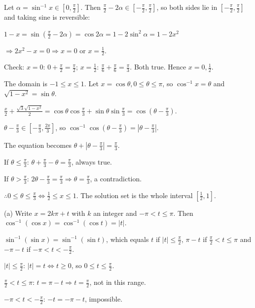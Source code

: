   Let $\alpha = \sin^{-1}x\in\left[0, \frac{\pi}{2}\right]$. Then $\frac{\pi}{2} - 2\alpha\in\left[-\frac{\pi}{2},
  \frac{\pi}{2}\right]$, so both sides lie in $\left[-\frac{\pi}{2}, \frac{\pi}{2}\right]$ and taking sine is
  reversible:

  $1 - x = \sin\left(\frac{\pi}{2} - 2\alpha\right) = \cos2\alpha = 1 - 2\sin^2\alpha = 1 - 2x^2$

  $\Rightarrow 2x^2 - x = 0\Rightarrow x = 0$ or $x = \frac{1}{2}$.

  Check: $x = 0$: $0 + \frac{\pi}{2} = \frac{\pi}{2}$; $x = \frac{1}{2}$: $\frac{\pi}{6} + \frac{\pi}{6} =
  \frac{\pi}{3}$. Both true. Hence $x = 0, \frac{1}{2}$.
\item The domain is $-1\le x\le 1$. Let $x = \cos\theta, 0\le\theta\le\pi$, so $\cos^{-1}x = \theta$ and $\sqrt{1 -
  x^2} = \sin\theta$.

  $\frac{x}{2} + \frac{\sqrt{3}\sqrt{1 - x^2}}{2} = \cos\theta\cos\frac{\pi}{3} + \sin\theta\sin\frac{\pi}{3} =
  \cos\left(\theta - \frac{\pi}{3}\right)$.

  $\theta - \frac{\pi}{3}\in\left[-\frac{\pi}{3}, \frac{2\pi}{3}\right]$, so $\cos^{-1}\cos\left(\theta -
  \frac{\pi}{3}\right) = \left|\theta - \frac{\pi}{3}\right|$.

  The equation becomes $\theta + \left|\theta - \frac{\pi}{3}\right| = \frac{\pi}{3}$.

  If $\theta\le\frac{\pi}{3}$: $\theta + \frac{\pi}{3} - \theta = \frac{\pi}{3}$, always true.

  If $\theta > \frac{\pi}{3}$: $2\theta - \frac{\pi}{3} = \frac{\pi}{3}\Rightarrow\theta = \frac{\pi}{3}$, a
  contradiction.

  $\therefore 0\le\theta\le\frac{\pi}{3}\Leftrightarrow\frac{1}{2}\le x\le 1$. The solution set is the whole
  interval $\left[\frac{1}{2}, 1\right]$.
\item (a) Write $x = 2k\pi + t$ with $k$ an integer and $-\pi < t\le\pi$. Then $\cos^{-1}(\cos x) = \cos^{-1}(\cos
  t) = |t|$.

  $\sin^{-1}(\sin x) = \sin^{-1}(\sin t)$, which equals $t$ if $|t|\le\frac{\pi}{2}$, $\pi - t$ if $\frac{\pi}{2} <
  t\le\pi$ and $-\pi - t$ if $-\pi < t < -\frac{\pi}{2}$.

  $|t|\le\frac{\pi}{2}$: $|t| = t\Leftrightarrow t\ge 0$, so $0\le t\le\frac{\pi}{2}$.

  $\frac{\pi}{2} < t\le\pi$: $t = \pi - t\Rightarrow t = \frac{\pi}{2}$, not in this range.

  $-\pi < t < -\frac{\pi}{2}$: $-t = -\pi - t$, impossible.

